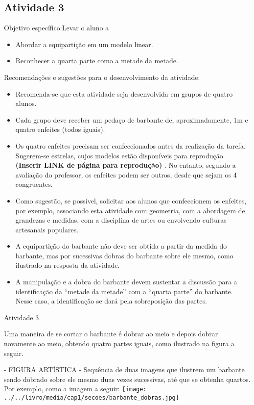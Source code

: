 \documentclass[oneside]{book}
\begin{document}
\begin{multicols}{2}
\subsection{Atividade 3}
  Objetivo específico:Levar o aluno a
\begin{itemize} %
    \item       Abordar a equipartição em um modelo linear.
    \item       Reconhecer a quarta parte como a metade da metade.
\end{itemize} %


  Recomendações e sugestões para o desenvolvimento da atividade:

\begin{itemize} %
    \item       Recomenda-se que esta atividade seja desenvolvida em grupos de quatro alunos.
    \item       Cada grupo deve receber um pedaço de barbante de, aproximadamente, 1m e quatro enfeites (todos iguais).
    \item       Os quatro enfeites precisam ser confeccionados antes da realização da tarefa. Sugerem-se estrelas, cujos modelos estão disponíveis para reprodução       {\bf (Inserir LINK de página para reprodução)}      . No entanto, segundo a avaliação do professor, os enfeites podem ser outros, desde que sejam os 4 congruentes.
    \item       Como sugestão, se possível, solicitar aos alunos que confeccionem os enfeites, por exemplo, associando esta atividade com geometria, com a abordagem de grandezas e medidas, com a disciplina de artes ou envolvendo culturas artesanais populares.
    \item       A equipartição do barbante não deve ser obtida a partir da medida do barbante, mas por sucessivas dobras do barbante sobre ele mesmo, como ilustrado na resposta da atividade.
    \item       A manipulação e a dobra do barbante devem sustentar a discussão para a identificação da       ``metade da metade''       com a       ``quarta parte''       do barbante. Nesse caso, a identificação se dará pela sobreposição das partes.
\end{itemize} %





\begin{resposta*}{Atividade 3}

Uma maneira de se cortar o barbante é dobrar ao meio e depois dobrar novamente ao meio, obtendo quatro partes iguais, como ilustrado na figura a seguir.
  \begin{imagem*}[breakable]{}{}     - FIGURA ARTÍSTICA - Sequência de duas imagens que ilustrem um barbante sendo dobrado sobre ele mesmo duas vezes sucessivas, até que se obtenha quartos. Por exemplo, como a imagem a seguir:
        \texttt{[image: ../../livro/media/cap1/secoes/barbante\_dobras.jpg]}
  \end{imagem*}
\end{resposta*}






\end{multicols}
\end{document}
